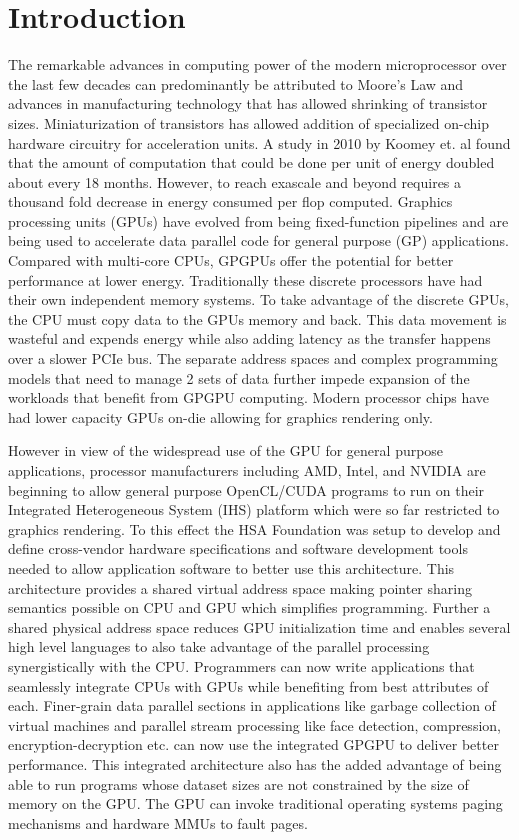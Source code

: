 \section{Introduction}\label{introduction}

\par The remarkable advances in computing power of the modern microprocessor over the last few decades can predominantly be attributed to Moore's Law and advances in manufacturing technology that has allowed shrinking of transistor sizes. Miniaturization of transistors has allowed addition of specialized on-chip hardware circuitry for acceleration units. A study in 2010 by Koomey et. al \cite{koomey} found that the amount of computation that could be done per unit of energy doubled about every 18 months. However, to reach exascale and beyond requires a thousand fold decrease in energy consumed per flop computed. Graphics processing units (GPUs) have evolved from being fixed-function pipelines and are being used to accelerate data parallel code for general purpose (GP) applications. Compared with multi-core CPUs, GPGPUs offer the potential for better performance at lower energy. Traditionally these discrete processors have had their own independent memory systems. To take advantage of the discrete GPUs, the CPU must copy data to the GPUs memory and back. This data movement is wasteful and expends energy while also adding latency as the transfer happens over a slower PCIe bus. The separate address spaces and complex programming models that need to manage 2 sets of data further impede expansion of the workloads that benefit from GPGPU computing. Modern processor chips have had lower capacity GPUs on-die allowing for graphics rendering only.
\par However in view of the widespread use of the GPU for general purpose applications, processor manufacturers including AMD\cite{amd-apu}, Intel\cite{inteliris}, and NVIDIA\cite{denver} are beginning to allow general purpose OpenCL/CUDA programs to run on their Integrated Heterogeneous System (IHS) platform which were so far restricted to graphics rendering. To this effect the HSA Foundation \cite{hsafoundation} was setup to develop and define cross-vendor hardware specifications and software development tools needed to allow application software to better use this architecture. This architecture provides a shared virtual address space making pointer sharing semantics possible on CPU and GPU which simplifies programming. Further a shared physical address space reduces GPU initialization time and enables several high level languages to also take advantage of the parallel processing synergistically with the CPU. Programmers can now write applications that seamlessly integrate CPUs with GPUs while benefiting from best attributes of each. Finer-grain data parallel sections in applications like garbage collection \cite{sumatra} of virtual machines and parallel stream processing like face detection, compression, encryption-decryption etc. can now use the integrated GPGPU to deliver better performance. This integrated architecture also has the added advantage of being able to run programs whose dataset sizes are not constrained by the size of memory on the GPU. The GPU can invoke traditional operating systems paging mechanisms and hardware MMUs to fault pages.
